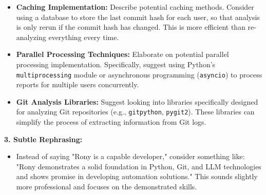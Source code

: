 \documentclass{article}
\begin{document}
\begin{itemize}
\begin{itemize}
\begin{itemize}
    \item \textbf{Caching Implementation:} Describe potential caching methods. Consider using a database to store the last commit hash for each user, so that analysis is only rerun if the commit hash has changed. This is more efficient than re-analyzing everything every time.
    \item \textbf{Parallel Processing Techniques:} Elaborate on potential parallel processing implementation. Specifically, suggest using Python's \texttt{multiprocessing} module or asynchronous programming (\texttt{asyncio}) to process reports for multiple users concurrently.
    \item \textbf{Git Analysis Libraries:} Suggest looking into libraries specifically designed for analyzing Git repositories (e.g., \texttt{gitpython}, \texttt{pygit2}). These libraries can simplify the process of extracting information from Git logs.
\end{itemize}
\textbf{3. Subtle Rephrasing:}
\begin{itemize}
     \item Instead of saying "Rony is a capable developer," consider something like: "Rony demonstrates a solid foundation in Python, Git, and LLM technologies and shows promise in developing automation solutions."  This sounds slightly more professional and focuses on the demonstrated skills.
\end{itemize}


\end{itemize}
\end{itemize}
\end{document}
